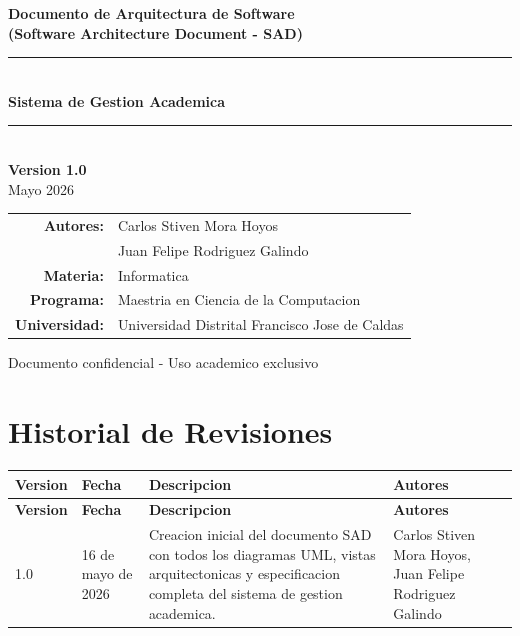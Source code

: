 \documentclass[12pt,a4paper]{article}
\begin{document}
\begin{titlepage}
    \centering
    \vspace*{1cm}
    
    {\Huge\bfseries\color{udgreen} Documento de Arquitectura de Software}\\[0.5cm]
    {\LARGE\bfseries (Software Architecture Document - SAD)}\\[2cm]
    
    \rule{\textwidth}{1.5pt}\\[0.5cm]
    {\Huge\bfseries Sistema de Gestion Academica}\\[0.3cm]
    \rule{\textwidth}{1.5pt}\\[2cm]
    
    {\Large\bfseries Version 1.0}\\[0.5cm]
    {\large Mayo 2026}\\[3cm]
    
    \begin{tabular}{rl}
        \textbf{Autores:} & Carlos Stiven Mora Hoyos \\
        & Juan Felipe Rodriguez Galindo \\[1cm]
        \textbf{Materia:} & Informatica \\
        \textbf{Programa:} & Maestria en Ciencia de la Computacion \\
        \textbf{Universidad:} & Universidad Distrital Francisco Jose de Caldas \\
    \end{tabular}
    
    \vfill
    
    {\small Documento confidencial - Uso academico exclusivo}
\end{titlepage}

\newpage
\section*{Historial de Revisiones}

\begin{longtable}{|p{2cm}|p{3cm}|p{6cm}|p{4cm}|}
\hline
\rowcolor{udgreen!20}
\textbf{Version} & \textbf{Fecha} & \textbf{Descripcion} & \textbf{Autores} \\
\hline
\endfirsthead
\hline
\rowcolor{udgreen!20}
\textbf{Version} & \textbf{Fecha} & \textbf{Descripcion} & \textbf{Autores} \\
\hline
\endhead
1.0 & 16 de mayo de 2026 & Creacion inicial del documento SAD con todos los diagramas UML, vistas arquitectonicas y especificacion completa del sistema de gestion academica. & Carlos Stiven Mora Hoyos, Juan Felipe Rodriguez Galindo \\
\hline
\end{longtable}
\end{document}
